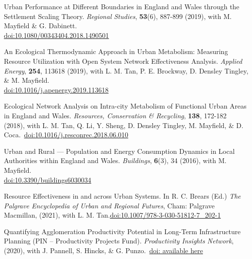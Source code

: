 \documentclass[10pt]{article}
\renewcommand{\section}[1]{\pagebreak[3]%
    \vspace{1.3\baselineskip}%
    \phantomsection\addcontentsline{toc}{section}{#1}%
    \noindent\llap{\large\smash{\parbox[t]{\marginparwidth}{\raggedright #1}}}%
    \vspace{-\baselineskip}\par}
\begin{document}
\begin{etaremune}[leftmargin=0ex, topsep=0ex]
	\item Urban Performance at Different Boundaries in England and Wales through the Settlement Scaling Theory. \emph{Regional Studies}, \textbf{53}(6), 887-899 (2019), with M. Mayfield \& G. Dabinett.~\\\href{http://dx.doi.org/10.1080/00343404.2018.1490501}{doi:10.1080/00343404.2018.1490501}

	\item An Ecological Thermodynamic Approach in Urban Metabolism: Measuring Resource Utilization with Open System Network Effectiveness Analysis. \emph{Applied Energy}, \textbf{254}, 113618 (2019), with L. M. Tan, P. E. Brockway, D. Densley Tingley, \& M. Mayfield.~\\\href{https://doi.org/10.1016/j.apenergy.2019.113618}{doi:10.1016/j.apenergy.2019.113618}
			
	\item Ecological Network Analysis on Intra-city Metabolism of Functional Urban Areas in England and Wales. \emph{Resources, Conservation \& Recycling}, \textbf{138}, 172-182 (2018), with L. M. Tan, Q. Li, Y. Sheng, D. Densley Tingley, M. Mayfield, \& D. Coca.~\href{https//doi.org/10.1016/j.resconrec.2018.06.010}{doi:10.1016/j.resconrec.2018.06.010}\label{sure.net}

	\item Urban and Rural --- Population and Energy Consumption Dynamics in Local Authorities within England and Wales. \emph{Buildings}, \textbf{6}(3), 34 (2016), with M. Mayfield.~\\\href{http://dx.doi.org/10.3390/buildings6030034}{doi:10.3390/buildings6030034}
	
\end{etaremune}
\renewcommand{\labelenumi}{R\theenumi.}
\section{Chapters \&\\Reports}
\begin{etaremune}[leftmargin=0ex, topsep=0ex]
	\item Resource Effectiveness in and across Urban Systems. In R. C. Brears (Ed.) \emph{The Palgrave Encyclopedia of Urban and Regional Futures}, Cham: Palgrave Macmillan, (2021), with L. M. Tan.\href{https://dx.doi.org/10.1007/978-3-030-51812-7_202-1}{doi:10.1007/978-3-030-51812-7\_202-1}
	
	\item Quantifying Agglomeration Productivity Potential in Long-Term
	Infrastructure Planning (PIN – Productivity Projects Fund). \emph{Productivity Insights Network}, (2020), with J. Pannell, S. Hincks, \& G. Punzo.~\href{https://ci1hea.github.io/assets/pdf/publications/Arbabi%20et%20al.%20-%202020%20-%20Quantifying%20Agglomeration%20Productivity%20Potential%20i.pdf}{doi: available here}\label{rpin}
\end{etaremune}
\renewcommand{\labelenumi}{O\theenumi.}
\end{document}
